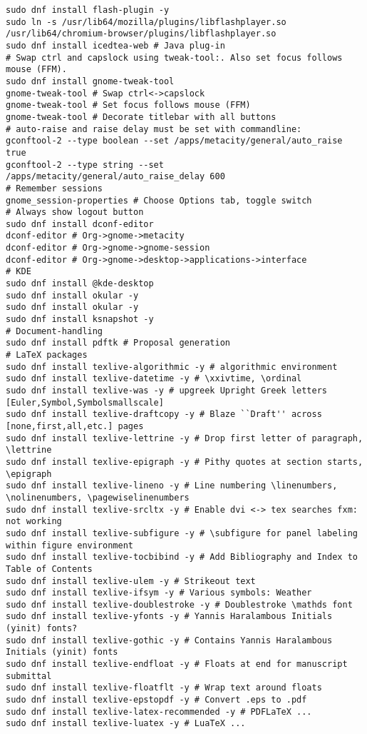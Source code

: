 \documentclass[12pt,twoside]{article}
\begin{document}
\begin{verbatim}
sudo dnf install flash-plugin -y
sudo ln -s /usr/lib64/mozilla/plugins/libflashplayer.so /usr/lib64/chromium-browser/plugins/libflashplayer.so
sudo dnf install icedtea-web # Java plug-in
# Swap ctrl and capslock using tweak-tool:. Also set focus follows mouse (FFM).
sudo dnf install gnome-tweak-tool
gnome-tweak-tool # Swap ctrl<->capslock
gnome-tweak-tool # Set focus follows mouse (FFM)
gnome-tweak-tool # Decorate titlebar with all buttons
# auto-raise and raise delay must be set with commandline:
gconftool-2 --type boolean --set /apps/metacity/general/auto_raise true
gconftool-2 --type string --set /apps/metacity/general/auto_raise_delay 600
# Remember sessions
gnome_session-properties # Choose Options tab, toggle switch
# Always show logout button
sudo dnf install dconf-editor
dconf-editor # Org->gnome->metacity
dconf-editor # Org->gnome->gnome-session
dconf-editor # Org->gnome->desktop->applications->interface
# KDE
sudo dnf install @kde-desktop
sudo dnf install okular -y 
sudo dnf install okular -y
sudo dnf install ksnapshot -y
# Document-handling
sudo dnf install pdftk # Proposal generation
# LaTeX packages
sudo dnf install texlive-algorithmic -y # algorithmic environment
sudo dnf install texlive-datetime -y # \xxivtime, \ordinal
sudo dnf install texlive-was -y # upgreek Upright Greek letters [Euler,Symbol,Symbolsmallscale]
sudo dnf install texlive-draftcopy -y # Blaze ``Draft'' across [none,first,all,etc.] pages
sudo dnf install texlive-lettrine -y # Drop first letter of paragraph, \lettrine
sudo dnf install texlive-epigraph -y # Pithy quotes at section starts, \epigraph
sudo dnf install texlive-lineno -y # Line numbering \linenumbers, \nolinenumbers, \pagewiselinenumbers
sudo dnf install texlive-srcltx -y # Enable dvi <-> tex searches fxm: not working
sudo dnf install texlive-subfigure -y # \subfigure for panel labeling within figure environment
sudo dnf install texlive-tocbibind -y # Add Bibliography and Index to Table of Contents
sudo dnf install texlive-ulem -y # Strikeout text
sudo dnf install texlive-ifsym -y # Various symbols: Weather
sudo dnf install texlive-doublestroke -y # Doublestroke \mathds font
sudo dnf install texlive-yfonts -y # Yannis Haralambous Initials (yinit) fonts?
sudo dnf install texlive-gothic -y # Contains Yannis Haralambous Initials (yinit) fonts
sudo dnf install texlive-endfloat -y # Floats at end for manuscript submittal
sudo dnf install texlive-floatflt -y # Wrap text around floats
sudo dnf install texlive-epstopdf -y # Convert .eps to .pdf
sudo dnf install texlive-latex-recommended -y # PDFLaTeX ...
sudo dnf install texlive-luatex -y # LuaTeX ...

\end{verbatim}
\end{document}
